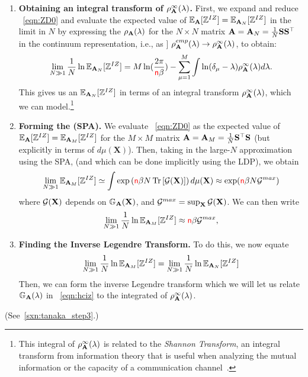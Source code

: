 \begin{enumerate}
   \item
   \textbf{Obtaining an integral transform of $\rho^{\infty}_{\mathbf{A}}(\lambda)$.}
   First, we expand and reduce \EQN~\ref{eqn:ZD0} and evaluate the expected value of
   $\mathbb{E}_{\mathbf{A}}[\mathbb{Z}^{IZ}]=\mathbb{E}_{\mathbf{A}_{N}}[\mathbb{Z}^{IZ}]$ in the \LargeN limit in $N$ by expressing the $\rho_{\mathbf{A}}(\lambda)$
   for the $N\times N$ matrix $\mathbf{A}=\mathbf{A}_N=\tfrac{1}{N}{\mathbf{S}}{\mathbf{S}}^{\top}$
   in the continuum representation, i.e., as ]
   $\rho^{emp}_{\mathbf{A}}(\lambda)\rightarrow \rho^{\infty}_{\mathbf{A}}(\lambda)$, to obtain:
   \begin{equation}
      \label{eqn:ZD_step1}
      \lim_{N\gg 1}\dfrac{1}{N}
      \ln\mathbb{E}_{\mathbf{A}_{N}}[\mathbb{Z}^{IZ}] =M\ln(\dfrac{2\pi}{{\color{red}\sf{n}}\beta})-\sum_{\mu=1}^{M}\int \ln(\delta_{\mu}-\lambda)\rho^{\infty}_{\mathbf{A}}(\lambda)d\lambda  .
   \end{equation}
   This gives us an $\mathbb{E}_{\mathbf{A}_{N}}[\mathbb{Z}^{IZ}]$ in terms of an integral transform $\rho^{\infty}_{\mathbf{A}}(\lambda)$, which we can model.\footnote{This integral of $\rho^{\infty}_{\mathbf{A}}(\lambda)$  is related to the \emph{Shannon Transform}, an integral transform from information theory that is useful when analyzing the mutual information or the capacity of a communication channel~\cite{Tanaka2007}. }
   \item
   \textbf{Forming the \SaddlePointApproximation (SPA).}
   We evaluate \EQN~\ref{eqn:ZD0} as the expected value of $\mathbb{E}_{\mathbf{A}}[\mathbb{Z}^{IZ}]=\mathbb{E}_{\mathbf{A}_{M}}[\mathbb{Z}^{IZ}]$
   for the $M \times M$ matrix $\mathbf{A}=\mathbf{A}_M=\tfrac{1}{N}{\mathbf{S}}^{\top}{\mathbf{S}}$
   (but explicitly in terms of $d\mu(\mathbf{X})$).
   Then, taking in the large-$N$ approximation using the SPA,
    (and which can be done implicitly using the LDP), we obtain
   \begin{equation}  
  \label{eqn:ZD1} 
  \lim_{N \gg 1} \mathbb{E}_{\mathbf{A}_{M}}[\mathbb{Z}^{IZ}]\simeq\int  \exp\left({\color{red}\sf{n}}\beta N\mbox{}\operatorname{Tr}\left[\mathcal{G}(\mathbf{X})\right]\right)d\mu(\mathbf{X}) \approx \exp({\color{red}\sf{n}}\beta N\mathcal{G}^{max})
\end{equation}
  where  $\mathcal{G}(\mathbf{X})$ depends on $\mathbb{G}_{\mathbf{A}}(\mathbf{X})$, and $\mathcal{G}^{max}=\sup_{\mathbf{X}}\mathcal{G}(\mathbf{X})$.
  We can then write
   \begin{equation}
      \label{eqn:ZD_step2}
      \lim_{N \gg 1}\dfrac{1}{N}\ln\mathbb{E}_{\mathbf{A}_{M}}[\mathbb{Z}^{IZ}] \approx {\color{red}\sf{n}}\beta\mathcal{G}^{max}  ,
   \end{equation}

 \item
 \textbf{Finding the Inverse Legendre Transform.}
  To do this, we now equate
  \begin{equation}
  \lim_{N \gg 1}\frac{1}{N}\ln\mathbb{E}_{\mathbf{A}_{M}}[\mathbb{Z}^{IZ}]=  \lim_{N \gg 1}\frac{1}{N}\ln\mathbb{E}_{\mathbf{A}_{N}}[\mathbb{Z}^{IZ}]
  \end{equation}
 Then, we can form the
 inverse Legendre transform  which we will let us relate $\mathbb{G}_{\mathbf{A}}(\lambda)$ in \EQN~\ref{eqn:hciz} to the integrated \RTransform of $\rho^{\infty}_{\mathbf{A}}(\lambda)$.
\end{enumerate}

\noindent

(See~\ref{sxn:tanaka_step3}.)


